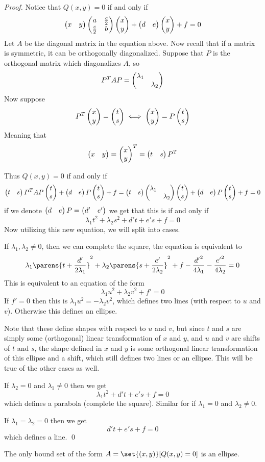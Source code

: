 \begin{proof}

    Notice that $Q(x,y)=0$ if and only if
    \[ \begin{pmatrix}x&y\end{pmatrix}\begin{pmatrix}a&\frac c2\\\frac c2&b\end{pmatrix}\begin{pmatrix}x\\y\end{pmatrix} + \begin{pmatrix}d&e\end{pmatrix}\begin{pmatrix}x\\y\end{pmatrix}+f = 0 \]
    Let $A$ be the diagonal matrix in the equation above.
    Now recall that if a matrix is symmetric, it can be orthogonally diagonalized.
    Suppose that $P$ is the orthogonal matrix which diagonalizes $A$, so
    \[ P^TAP = \begin{pmatrix}\lambda_1\\&\lambda_2\end{pmatrix} \]
    Now suppose
    \[ P^T\begin{pmatrix}x\\y\end{pmatrix} = \begin{pmatrix}t\\s\end{pmatrix} \iff \begin{pmatrix}x\\y\end{pmatrix} = P\begin{pmatrix}t\\s\end{pmatrix} \]
    Meaning that
    \[ \begin{pmatrix}x&y\end{pmatrix} = \begin{pmatrix}x\\y\end{pmatrix}^T = \begin{pmatrix}t&s\end{pmatrix}P^T \]

    Thus $Q(x,y)=0$ if and only if
    \[ \begin{pmatrix}t&s\end{pmatrix}P^TAP\begin{pmatrix}t\\s\end{pmatrix} + \begin{pmatrix}d&e\end{pmatrix}P\begin{pmatrix}t\\s\end{pmatrix} + f = \begin{pmatrix}t&s\end{pmatrix}\begin{pmatrix}\lambda_1\\&\lambda_2\end{pmatrix}\begin{pmatrix}t\\s\end{pmatrix} + \begin{pmatrix}d&e\end{pmatrix}P\begin{pmatrix}t\\s\end{pmatrix}+f = 0 \]
    if we denote $\begin{pmatrix}d&e\end{pmatrix}P=\begin{pmatrix}d'&e'\end{pmatrix}$ we get that this is if and only if
    \[ \lambda_1t^2+\lambda_2s^2 + d't + e's + f = 0 \]
    Now utilizing this new equation, we will split into cases.

    \benum
        \item If $\lambda_1,\lambda_2\neq0$, then we can complete the square, the equation is equivalent to
        \[ \lambda_1\parens{t+\frac{d'}{2\lambda_1}}^2 + \lambda_2\parens{s+\frac{e'}{2\lambda_2}}^2 + f-\frac{{d'}^2}{4\lambda_1}-\frac{{e'}^2}{4\lambda_2} = 0 \]
        This is equivalent to an equation of the form
        \[ \lambda_1u^2 + \lambda_2v^2 + f' = 0 \]
        If $f'=0$ then this is $\lambda_1u^2=-\lambda_2v^2$, which defines two lines (with respect to $u$ and $v$).
        Otherwise this defines an ellipse.

        Note that these define shapes with respect to $u$ and $v$, but since $t$ and $s$ are simply some (orthogonal) linear transformation of $x$ and $y$, and $u$ and $v$ are shifts of $t$ and $s$,
        the shape defined in $x$ and $y$ is some orthogonal linear transformation of this ellipse and a shift, which still defines two lines or an ellipse.
        This will be true of the other cases as well.

        \item If $\lambda_2=0$ and $\lambda_1\neq0$ then we get
        \[ \lambda_1t^2 + d't + e's + f = 0 \]
        which defines a parabola (complete the square).
        Similar for if $\lambda_1=0$ and $\lambda_2\neq0$.

        \item If $\lambda_1=\lambda_2=0$ then we get
        \[ d't + e's + f = 0 \]
        which defines a line.
        \qed
    \eenum

\end{proof}

\begin{coro*}

    The only bound set of the form $A=\set{(x,y)}[Q(x,y)=0]$ is an ellipse.

\end{coro*}


